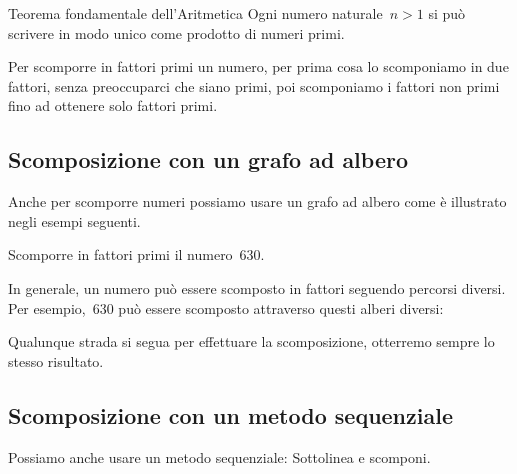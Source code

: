 \begin{teorema}{Teorema fondamentale dell'Aritmetica}{}
Ogni numero naturale~\(n>1\) si può scrivere in modo unico come prodotto 
di numeri primi.
\end{teorema}

Per scomporre in fattori primi un numero, per prima cosa lo scomponiamo in 
due fattori, senza preoccuparci che siano primi, poi scomponiamo i fattori
non primi fino ad ottenere solo fattori primi.

\subsection{Scomposizione con un grafo ad albero}

Anche per scomporre numeri possiamo usare un grafo ad albero come è 
illustrato negli esempi seguenti.

\begin{esempio}{}{}
Scomporre in fattori primi il numero~630.

\vspace{-1em}
{\scompa}
\end{esempio}

In generale, un numero può essere scomposto in fattori seguendo percorsi 
diversi. Per esempio,~630 può essere scomposto attraverso questi alberi
diversi:


Qualunque strada si segua per effettuare la scomposizione, 
otterremo sempre lo stesso risultato.

\subsection{Scomposizione con un metodo sequenziale}

Possiamo anche usare un metodo sequenziale:
Sottolinea e scomponi.

